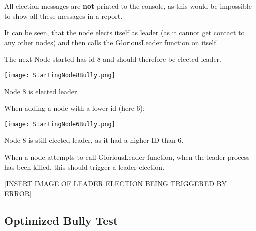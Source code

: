 All election messages are \textbf{not} printed to the console, as this would be impossible to show all these messages in a report.

It can be seen, that the node elects itself as leader (as it cannot get contact to any other nodes) and then calls the GloriousLeader function on itself. 

The next Node started has id 8 and should therefore be elected leader.

\begin{center}
	\texttt{[image: StartingNode8Bully.png]}
\end{center}

Node 8 is elected leader. 

When adding a node with a lower id (here 6):

\begin{center}
	\texttt{[image: StartingNode6Bully.png]}
\end{center}

Node 8 is still elected leader, as it had a higher ID than 6.

When a node attempts to call GloriousLeader function, when the leader process has been killed, this should trigger a leader election. 

[INSERT IMAGE OF LEADER ELECTION BEING TRIGGERED BY ERROR]

\subsection{Optimized Bully Test}
